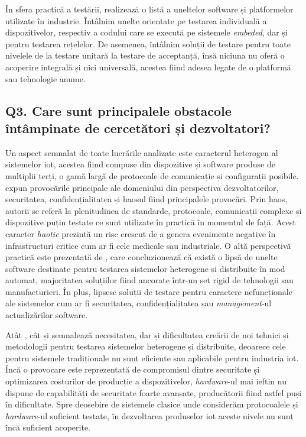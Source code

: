 În sfera practică a testării, \cite{Dias2018} realizează o listă a uneltelor software și platformelor utilizate în industrie. Întâlnim unelte orientate pe testarea individuală a dispozitivelor, respectiv a codului care se execută pe sistemele \textit{embeded}, dar și pentru testarea rețelelor. De asemenea, întâlnim soluții de testare pentru toate nivelele de la testare unitară la testare de acceptanță, însă niciuna nu oferă o acoperire integrală și nici universală, acestea fiind adesea legate de o platformă sau tehnologie anume. %

\subsection*{Q3. Care sunt principalele obstacole întâmpinate de cercetători și dezvoltatori?}

Un aspect semnalat de toate lucrările analizate este caracterul heterogen al sistemelor \acrshort{iot}, acestea fiind compuse din dispozitive și software produse de multiplii terți, o gamă largă de protocoale de comunicație și configurații posibile. \cite{Lee2015} expun provocările principale ale domeniului din perspectiva dezvoltatorilor, securitatea, confidențialitatea și haosul fiind principalele provocări. Prin haos, autorii se referă la plenitudinea de standarde, protocoale, comunicații complexe și dispozitive puțin testate ce sunt utilizate în practică în momentul de față. Acest caracter \textit{haotic} prezintă un risc crescut de a genera evenimente negative în infrastructuri critice cum ar fi cele medicale sau industriale. O altă perspectivă practică este prezentată de \cite{Dias2018}, care concluzionează că există o lipsă de unelte software destinate pentru testarea sistemelor heterogene și distribuite în mod automat, majoritatea soluțiilor fiind ancorate într-un set rigid de tehnologii sau manufacturieri. În plus, lipsesc soluții de testare pentru caractere nefuncționale ale sistemelor cum ar fi securitatea, confidențialitatea sau \textit{management}-ul actualizărilor software.

Atât \cite{Corts2019}, cât și \cite{Ahmed2019} semnalează necesitatea, dar și dificultatea creării de noi tehnici și metodologii pentru testarea sistemelor heterogene și distribuite, deoarece cele pentru sistemele tradiționale nu sunt eficiente sau aplicabile pentru industria \acrshort{iot}. Încă o provocare este reprezentată de compromisul dintre securitate și optimizarea costurilor de producție a dispozitivelor, \textit{hardware}-ul mai ieftin nu dispune de capabilități de securitate foarte avansate, producătorii fiind astfel puși în dificultate. Spre deosebire de sistemele clasice unde considerăm protocoalele și \textit{hardware}-ul suficient testate, în dezvoltarea produselor \acrshort{iot} aceste nivele nu sunt încă suficient acoperite.

